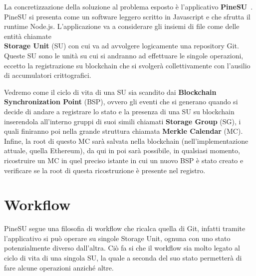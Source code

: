 
La concretizzazione della soluzione al problema esposto è l’applicativo \textbf{PineSU}~\cite{pinesu-github-21}. \\
PineSU si presenta come un software leggero scritto in Javascript e che sfrutta il runtime Node.js.
L’applicazione va a considerare gli insiemi di file come delle entità chiamate \\
\textbf{Storage Unit} (SU) con cui va ad avvolgere logicamente una repository Git. \\
Queste SU sono le unità su cui si andranno ad effettuare le singole
operazioni, eccetto la registrazione su blockchain che si svolgerà collettivamente con l’ausilio di accumulatori crittografici. 

Vedremo come il ciclo di vita di una SU sia scandito dai \textbf{Blockchain Synchronization Point} (BSP),
ovvero gli eventi che si generano quando si decide di andare a registrare lo stato e la presenza di una SU su blockchain inserendola
all’interno gruppi di suoi simili chiamati \textbf{Storage Group} (SG), i quali finiranno poi nella grande struttura chiamata \textbf{Merkle Calendar} (MC).
Infine, la root di questo MC sarà salvata nella blockchain (nell’implementazione attuale, quella Ethereum), da qui in poi sarà possibile, in qualsiasi momento, ricostruire un MC in quel preciso istante in cui un nuovo BSP è stato creato e verificare se la root di questa ricostruzione è presente nel registro.

\section{Workflow}
\label{sec:work}

PineSU segue una filosofia di workflow che ricalca quella di Git,
infatti tramite l’applicativo si può operare su singole Storage Unit, ognuna con uno stato potenzialmente
diverso dall’altra. Ciò fa si che il workflow sia molto legato al ciclo di vita di una singola SU, la quale
a seconda del suo stato permetterà di fare alcune operazioni anziché altre.

